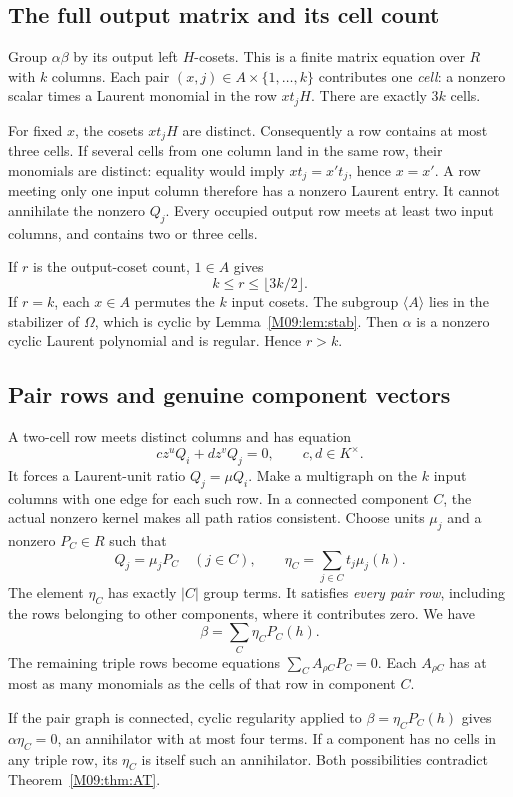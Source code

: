 \documentclass[11pt,a4paper,oneside]{report}
\theoremstyle{definition}
\theoremstyle{remark}
\begin{document}
\subsection{The full output matrix and its cell count}
Group $\alpha\beta$ by its output left $H$-cosets. This is a
finite matrix equation over $R$ with $k$ columns. Each pair
$(x,j)\in A\times\{1,\ldots,k\}$ contributes one \emph{cell}:
a nonzero scalar times a Laurent monomial in the row $xt_jH$.
There are exactly $3k$ cells.

For fixed $x$, the cosets $xt_jH$ are distinct. Consequently a row
contains at most three cells. If several cells from one column
land in the same row, their monomials are distinct: equality
would imply $xt_j=x't_j$, hence $x=x'$. A row meeting only one
input column therefore has a nonzero Laurent entry. It cannot
annihilate the nonzero $Q_j$. Every occupied output row meets at
least two input columns, and contains two or three cells.

If $r$ is the output-coset count, $1\in A$ gives
\begin{equation}\label{M09:eq:rowcount}
k\le r\le\lfloor3k/2\rfloor.
\end{equation}
If $r=k$, each $x\in A$ permutes the $k$ input cosets. The subgroup
$\langle A\rangle$ lies in the stabilizer of $\Omega$, which is
cyclic by Lemma~\ref{M09:lem:stab}. Then $\alpha$ is a nonzero cyclic
Laurent polynomial and is regular. Hence $r>k$.

\subsection{Pair rows and genuine component vectors}
A two-cell row meets distinct columns and has equation
\[
c z^uQ_i+d z^vQ_j=0,\qquad c,d\in K^\times.
\]
It forces a Laurent-unit ratio $Q_j=\mu Q_i$.
Make a multigraph on the $k$ input columns with one edge for each
such row. In a connected component $C$, the actual nonzero kernel
makes all path ratios consistent. Choose units $\mu_j$ and a
nonzero $P_C\in R$ such that
\[
Q_j=\mu_jP_C\quad(j\in C),\qquad
\eta_C=\sum_{j\in C}t_j\mu_j(h).
\]
The element $\eta_C$ has exactly $|C|$ group terms. It satisfies
\emph{every pair row}, including the rows belonging to other
components, where it contributes zero. We have
\[
\beta=\sum_C\eta_CP_C(h).
\]
The remaining triple rows become equations
$\sum_C A_{\rho C}P_C=0$. Each $A_{\rho C}$ has at most as
many monomials as the cells of that row in component $C$.

If the pair graph is connected, cyclic regularity applied to
$\beta=\eta_CP_C(h)$ gives $\alpha\eta_C=0$, an annihilator
with at most four terms. If a component has no cells in any
triple row, its $\eta_C$ is itself such an annihilator. Both
possibilities contradict Theorem~\ref{M09:thm:AT}.
\end{document}
